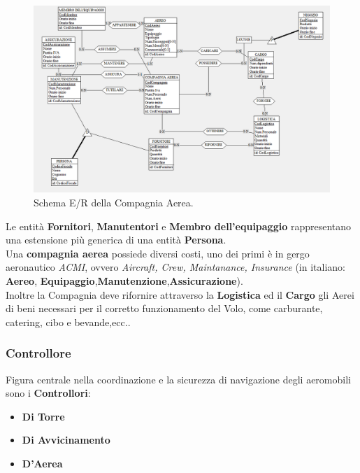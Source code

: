 \begin{figure}[H] %
	\centering
	\includegraphics[width=1.2\linewidth, height=1.2\textheight, keepaspectratio]{./img/Compagnia_Aerea.png}
	\caption{Schema E/R della Compagnia Aerea.}
	\label{fig:schema_compagnia_aerea}
\end{figure}

\textsf{\small Le entità \textbf{Fornitori}, \textbf{Manutentori} e \textbf{Membro dell'equipaggio} rappresentano una estensione più generica di una entità \textbf{Persona}.  }\\

\textsf{\small Una \textbf{compagnia aerea} possiede diversi costi, uno dei primi è in gergo aeronautico \emph{ACMI}, ovvero \emph{Aircraft, Crew, Maintanance, Insurance} (in italiano: \textbf{Aereo}, \textbf{Equipaggio},\textbf{Manutenzione},\textbf{Assicurazione}).}\\

\textsf{\small Inoltre la Compagnia deve rifornire attraverso la \textbf{Logistica} ed il \textbf{Cargo} gli Aerei di beni necessari per il corretto funzionamento del Volo, come carburante, catering, cibo e bevande,ecc..}\\


\newpage

\subsubsection{Controllore}

\textsf{\small Figura centrale nella coordinazione e la sicurezza di navigazione degli aeromobili sono i \textbf{Controllori}: }\\
\begin{itemize}
	\item \textbf{\small Di Torre}
	\item \textbf{\small Di Avvicinamento}
	\item \textbf{\small D'Aerea}
\end{itemize}

